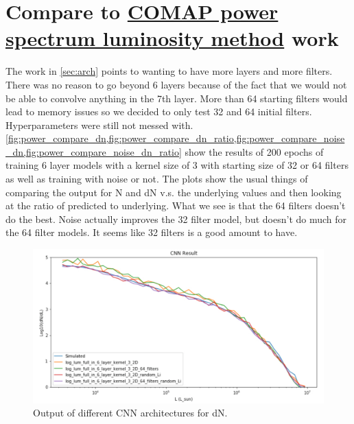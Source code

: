 \documentclass{article}
\begin{document}
	\section{Compare to \href{https://arxiv.org/pdf/1808.07487.pdf}{COMAP power spectrum luminosity method} work} \label{sec:power_compare}
		The work in \cref{sec:arch} points to wanting to have more layers and more filters.  There was no reason to go beyond 6 layers because of the fact that we would not be able to convolve anything in the 7th layer.  More than 64 starting filters would lead to memory issues so we decided to only test 32 and 64 initial filters.  Hyperparameters were still not messed with.  \cref{fig:power_compare_dn,fig:power_compare_dn_ratio,fig:power_compare_noise_dn,fig:power_compare_noise_dn_ratio} show the results of 200 epochs of training 6 layer models with a kernel size of 3 with starting size of 32 or 64 filters as well as training with noise or not.  The plots show the usual things of comparing the output for N and dN v.s. the underlying values and then looking at the ratio of predicted to underlying.  What we see is that the 64 filters doesn't do the best.  Noise actually improves the 32 filter model, but doesn't do much for the 64 filter models.  It seems like 32 filters is a good amount to have.

		\begin{figure}[H]
				\centering
			\includegraphics[width=1.0\textwidth]{power_compare_dn.pdf}
			\caption{Output of different CNN architectures for dN.}
			\label{fig:power_compare_dn}
		\end{figure}
\end{document}

